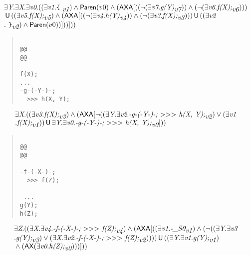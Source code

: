 \documentclass{article}
\newcommand{\U}{\,\mbox{\sf{U}}\,}
\newcommand{\A}{\mbox{\sf{A}}}
\newcommand{\AX}{\mbox{\sf{AX}}}
\newcommand{\mita}[1]{\mbox{\it{{#1}}}}
\newcommand{\msf}[1]{\mbox{\sf{{#1}}}}
\newcommand{\mth}[1]{\({#1}\)}
\newcommand{\ttlb}{\mbox{\tt \char'173}}
\newcommand{\ttrb}{\mbox{\tt \char'175}}
\begin{document}
\[\begin{array}{l}
\exists \mita{Y} . \exists \mita{X} . \exists \mita{v0} . ((\exists \mita{v1} . \mita{{\ttlb}
  }_{\mita{v1}}) \wedge \msf{Paren}(v0) \wedge (\AX\A[((\neg (\exists \mita{v7} . \mita{g(Y)}_{\mita{v7}})) \wedge (\neg (\exists \mita{v6} . \mita{f(X);}_{\mita{v6}})))\\\mbox{} \U ((\exists \mita{v5} . \mita{f(X);}_{\mita{v5}}) \wedge (\AX\A[((\neg (\exists \mita{v4} . \mita{h(Y)}_{\mita{v4}})) \wedge (\neg (\exists \mita{v3} . \mita{f(X);}_{\mita{v3}}))) \U ((\exists \mita{v2}\\\mbox{} . \mita{
{\ttrb}}_{\mita{v2}}) \wedge \msf{Paren}(v0))]
))]
))
\end{array}\]

\begin{quote}\begin{verbatim}

@@
@@

f(X);
...
-g-(-Y-)-;
  >>> h(X, Y);

\end{verbatim}\end{quote}

\[\begin{array}{l}
\exists \mita{X} . ((\exists \mita{v3} . \mita{f(X);}_{\mita{v3}}) \wedge (\AX\A[\neg ((\exists \mita{Y} . \exists \mita{v2} . \mita{-g-(-Y-)-;
  \mth{>}\mth{>}\mth{>} h(X, Y);}_{\mita{v2}}) \vee (\exists \mita{v1}\\\mbox{} . \mita{f(X);}_{\mita{v1}})) \U \exists \mita{Y} . \exists \mita{v0} . \mita{-g-(-Y-)-;
  \mth{>}\mth{>}\mth{>} h(X, Y);}_{\mita{v0}}]
))
\end{array}\]

\begin{quote}\begin{verbatim}

@@
@@

-f-(-X-)-;
  >>> f(Z);

-...
g(Y);
h(Z);
\end{verbatim}\end{quote}

\[\begin{array}{l}
\exists \mita{Z} . ((\exists \mita{X} . \exists \mita{v4} . \mita{-f-(-X-)-;
  \mth{>}\mth{>}\mth{>} f(Z);}_{\mita{v4}}) \wedge (\AX\A[((\exists \mita{v1} . \mita{-\_S0}_{\mita{v1}}) \wedge (\neg ((\exists \mita{Y} . \exists \mita{v3}\\\mbox{} . \mita{g(Y);}_{\mita{v3}}) \vee (\exists \mita{X} . \exists \mita{v2} . \mita{-f-(-X-)-;
  \mth{>}\mth{>}\mth{>} f(Z);}_{\mita{v2}})))) \U ((\exists \mita{Y} . \exists \mita{v1} . \mita{g(Y);}_{\mita{v1}})\\\mbox{} \wedge (\AX(\exists \mita{v0} . \mita{h(Z);}_{\mita{v0}})))]
))
\end{array}\]
\end{document}

